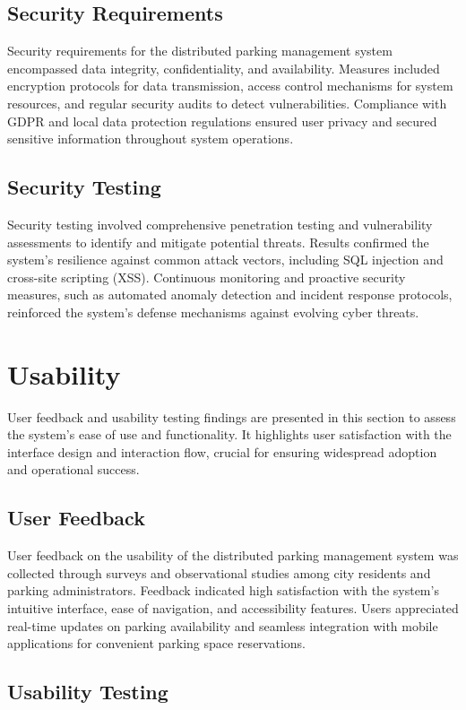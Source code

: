 \documentclass[oneside, 12pt, a4paper, draft]{book}
\begin{document}
\section{Security Requirements}
\label{sec:orgf3a594f}

Security requirements for the distributed parking management system encompassed data integrity, confidentiality, and availability. Measures included encryption protocols for data transmission, access control mechanisms for system resources, and regular security audits to detect vulnerabilities. Compliance with GDPR and local data protection regulations ensured user privacy and secured sensitive information throughout system operations.
\section{Security Testing}
\label{sec:org3785fe7}

Security testing involved comprehensive penetration testing and vulnerability assessments to identify and mitigate potential threats. Results confirmed the system's resilience against common attack vectors, including SQL injection and cross-site scripting (XSS). Continuous monitoring and proactive security measures, such as automated anomaly detection and incident response protocols, reinforced the system's defense mechanisms against evolving cyber threats.
\chapter{Usability}
\label{sec:org54ece25}
User feedback and usability testing findings are presented in this section to assess the system's ease of use and functionality. It highlights user satisfaction with the interface design and interaction flow, crucial for ensuring widespread adoption and operational success.
\section{User Feedback}
\label{sec:org528a7b2}

User feedback on the usability of the distributed parking management system was collected through surveys and observational studies among city residents and parking administrators. Feedback indicated high satisfaction with the system's intuitive interface, ease of navigation, and accessibility features. Users appreciated real-time updates on parking availability and seamless integration with mobile applications for convenient parking space reservations.
\section{Usability Testing}
\label{sec:org518f284}
\end{document}

